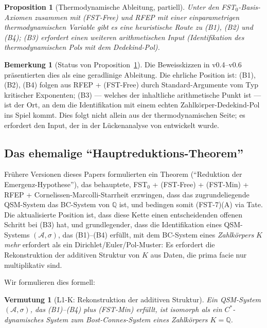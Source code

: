 \documentclass[11pt,a4paper]{article}
\theoremstyle{plain}
\newtheorem{proposition}[theorem]{Proposition}
\newtheorem{conjecture}[theorem]{Vermutung}
\theoremstyle{definition}
\newtheorem{remark}[theorem]{Bemerkung}
\newcommand{\Q}{\mathbb{Q}}
\begin{document}
\begin{proposition}[Thermodynamische Ableitung, partiell]\label{prop:thermo-derivation}
Unter den FST$_0$-Basis-Axiomen zusammen mit (FST-Free) und RFEP mit
einer einparametrigen thermodynamischen Variable gibt es eine heuristische
Route zu (B1), (B2) und (B4); (B3) erfordert einen weiteren arithmetischen Input
(Identifikation des thermodynamischen Pols mit dem Dedekind-Pol).
\end{proposition}

\begin{remark}[Status von Proposition~\ref{prop:thermo-derivation}]
\label{rem:thermo-status}
Die Beweisskizzen in v0.4--v0.6 präsentierten dies als eine geradlinige
Ableitung. Die ehrliche Position ist: (B1), (B2), (B4) folgen aus
RFEP + (FST-Free) durch Standard-Argumente vom Typ kritischer Exponenten;
(B3) --- welches der inhaltliche arithmetische Punkt ist --- ist der Ort, an dem die
Identifikation mit einem echten Zahlkörper-Dedekind-Pol ins Spiel kommt.
Dies folgt nicht allein aus der thermodynamischen Seite; es erfordert den Input,
der in der Lückenanalyse von \cite{L1KAttack} entwickelt wurde.
\end{remark}

\subsection{Das ehemalige ``Hauptreduktions-Theorem''}
\label{sec:former-reduction}

Frühere Versionen dieses Papers formulierten ein Theorem (``Reduktion der
Emergenz-Hypothese''), das behauptete, FST$_0$ + (FST-Free) +
(FST-Min) + RFEP + Cornelissen-Marcolli-Starrheit erzwingen, dass das
zugrundeliegende QSM-System das BC-System von $\Q$ ist, und bedingen somit
(FST-7)(A) via Tate. Die aktualisierte Position ist, dass diese Kette einen
entscheidenden offenen Schritt bei (B3) hat, und grundlegender, dass die
Identifikation eines QSM-Systems $(\mathcal A, \sigma)$, das
(B1)--(B4) erfüllt, mit dem BC-System eines \emph{Zahlkörpers} $K$ \emph{mehr}
erfordert als ein Dirichlet/Euler/Pol-Muster: Es erfordert die Rekonstruktion
der additiven Struktur von $K$ aus Daten, die prima facie nur multiplikativ sind.

Wir formulieren dies formell:

\begin{conjecture}[L1-K: Rekonstruktion der additiven Struktur]
\label{conj:l1k}
Ein QSM-System $(\mathcal A, \sigma)$, das (B1)--(B4) plus
(FST-Min) erfüllt, ist isomorph als ein $C^\ast$-dynamisches System zum
Bost-Connes-System eines Zahlkörpers $K = \Q$.
\end{conjecture}
\end{document}

